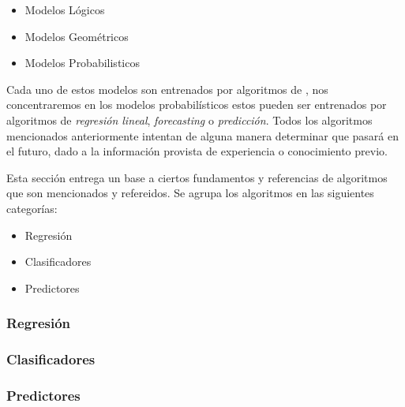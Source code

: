 \begin{itemize}
			\setlength{\itemsep}{1pt}
			\setlength{\parskip}{0pt}
			\setlength{\parsep}{0pt}
 \item Modelos Lógicos
 \item Modelos Geométricos
 \item Modelos Probabilisticos
\end{itemize} 


Cada uno de estos modelos son entrenados por algoritmos de \machinelearning, nos concentraremos en los modelos probabilísticos estos pueden ser entrenados por algoritmos de \emph{regresión lineal}, \emph{forecasting} o \emph{predicción}. Todos los algoritmos mencionados anteriormente intentan de alguna manera determinar que pasará en el futuro, dado a la información provista de experiencia o conocimiento previo.





Esta sección entrega un base a ciertos fundamentos y referencias de algoritmos que son mencionados y refereidos. Se agrupa los algoritmos en  las siguientes categorías:

\begin{itemize}
			\setlength{\itemsep}{1pt}
			\setlength{\parskip}{0pt}
			\setlength{\parsep}{0pt}
	\item Regresión
	\item Clasificadores	
	\item Predictores
\end{itemize}



\subsubsection{Regresión}
		
\subsubsection{Clasificadores}
		
\subsubsection{Predictores}
		

